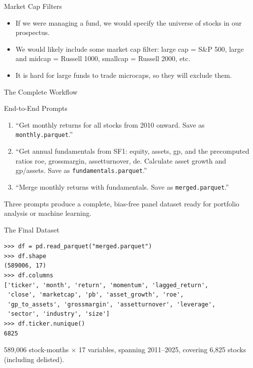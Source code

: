 \documentclass[aspectratio=169,t]{beamer}
\begin{document}
\begin{frame}{Market Cap Filters}
\begin{itemize}
\item If we were managing a fund, we would specify the universe of stocks in our prospectus.
\item We would likely include some market cap filter: large cap = S\&P 500, large and midcap = Russell 1000, smallcap = Russell 2000, etc.
\item It is hard for large funds to trade microcaps, so they will exclude them.
\end{itemize}
\end{frame}


\begin{frame}[c]
\centering
\Huge The Complete Workflow
\end{frame}

\begin{frame}{End-to-End Prompts}
\begin{enumerate}
\item ``Get monthly returns for all stocks from 2010 onward.  Save as \texttt{monthly.parquet}.''
\item ``Get annual fundamentals from SF1: equity, assets, gp, and the precomputed ratios roe, grossmargin, assetturnover, de.  Calculate asset growth and gp/assets.  Save as \texttt{fundamentals.parquet}.''
\item ``Merge monthly returns with fundamentals.  Save as \texttt{merged.parquet}.''
\end{enumerate}

\vspace{0.3cm}
Three prompts produce a complete, bias-free panel dataset ready for portfolio analysis or machine learning.
\end{frame}

\begin{frame}[fragile]{The Final Dataset}
\small
\begin{verbatim}
>>> df = pd.read_parquet("merged.parquet")
>>> df.shape
(589006, 17)
>>> df.columns
['ticker', 'month', 'return', 'momentum', 'lagged_return',
 'close', 'marketcap', 'pb', 'asset_growth', 'roe',
 'gp_to_assets', 'grossmargin', 'assetturnover', 'leverage',
 'sector', 'industry', 'size']
>>> df.ticker.nunique()
6825
\end{verbatim}

\vspace{0.2cm}
589,006 stock-months $\times$ 17 variables, spanning 2011--2025, covering 6,825 stocks (including delisted).
\end{frame}
\end{document}
